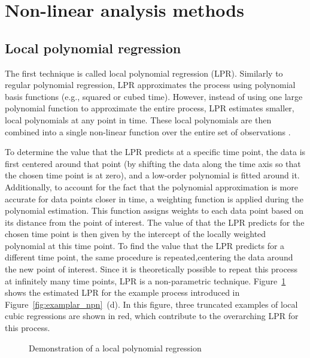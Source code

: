 \documentclass[man, floatsintext]{apa7}
\begin{document}
\section{Non-linear analysis methods}\label{method_introduction}

\subsection{Local polynomial regression}

The first technique is called local polynomial regression (LPR). Similarly to
regular polynomial regression, LPR approximates the process using polynomial
basis functions (e.g., squared or cubed time). However, instead of using one
large polynomial function to approximate the entire process, LPR estimates
smaller, local polynomials at any point in time. These local polynomials are
then combined into a single non-linear function over the entire set of
observations
\parencite{fan_adaptive_1995, ruppert_multivariate_1994, fan_local_2018}.

To determine the value that the LPR predicts at a specific time point, the data
is first centered around that point (by shifting the data along the time axis
so that the chosen time point is at zero), and a low-order polynomial is fitted
around it. Additionally, to account for the fact that the polynomial
approximation is more accurate for data points closer in time, a weighting
function is applied during the polynomial estimation. This function assigns
weights to each data point based on its distance from the point of interest.
The value of that the LPR predicts for the chosen time point is then given by
the intercept of the locally weighted polynomial at this time point.
To find the value that the LPR predicts for a different time point, the same
procedure is repeated,centering the data around the new point of interest.
Since it is theoretically possible to repeat this process at infinitely many
time points, LPR is a non-parametric technique. Figure~\ref{fig:locpol_dem}
shows the estimated LPR for the example process introduced in
Figure~\ref{fig:examplar_npn}~(d).  In this figure, three truncated examples of
local cubic regressions are shown
in red, which contribute to the overarching LPR for this process.\@

\begin{figure}[!ht]
  \caption{Demonstration of a local polynomial regression}
  \label{fig:locpol_dem}
\end{figure}
\end{document}
